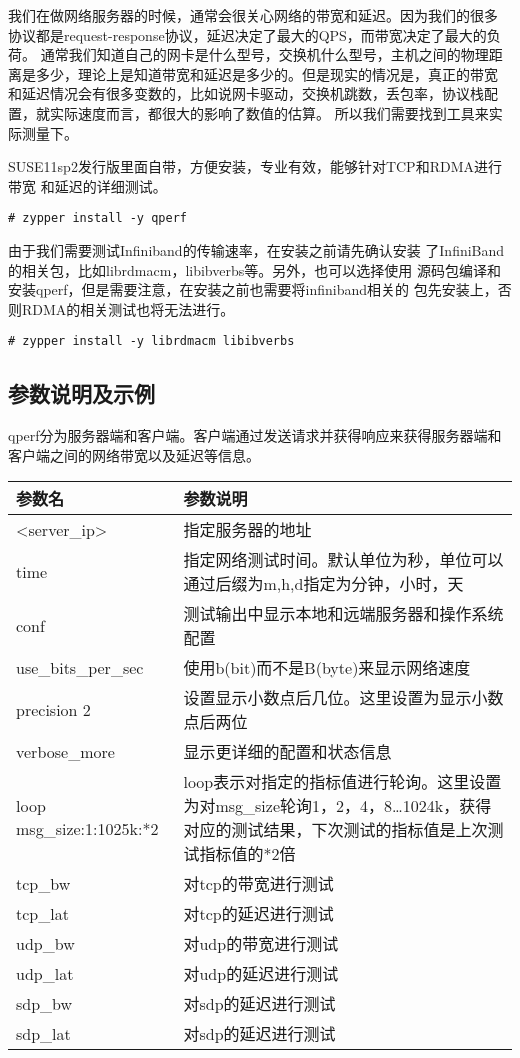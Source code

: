 我们在做网络服务器的时候，通常会很关心网络的带宽和延迟。因为我们的很多
协议都是request-response协议，延迟决定了最大的QPS，而带宽决定了最大的负
荷。 通常我们知道自己的网卡是什么型号，交换机什么型号，主机之间的物理距
离是多少，理论上是知道带宽和延迟是多少的。但是现实的情况是，真正的带宽
和延迟情况会有很多变数的，比如说网卡驱动，交换机跳数，丢包率，协议栈配
置，就实际速度而言，都很大的影响了数值的估算。 所以我们需要找到工具来实
际测量下。

SUSE11sp2发行版里面自带，方便安装，专业有效，能够针对TCP和RDMA进行带宽
和延迟的详细测试。

\begin{verbatim}
# zypper install -y qperf
\end{verbatim}

由于我们需要测试Infiniband的传输速率，在安装之前请先确认安装
了InfiniBand的相关包，比如librdmacm，libibverbs等。另外，也可以选择使用
源码包编译和安装qperf，但是需要注意，在安装之前也需要将infiniband相关的
包先安装上，否则RDMA的相关测试也将无法进行。

\begin{verbatim}
# zypper install -y librdmacm libibverbs
\end{verbatim}

\subsection{参数说明及示例}

qperf分为服务器端和客户端。客户端通过发送请求并获得响应来获得服务器端和
客户端之间的网络带宽以及延迟等信息。

\begin{tabular}{lp{20em}}
  \toprule
  参数名       & 参数说明 \\
  \midrule
  <server\_ip>	& 指定服务器的地址 \\
  time            & 指定网络测试时间。默认单位为秒，单位可以通过后缀为m,h,d指定为分钟，小时，天 \\
  conf	        & 测试输出中显示本地和远端服务器和操作系统配置 \\
  use\_bits\_per\_sec & 使用b(bit)而不是B(byte)来显示网络速度 \\
  precision 2	& 设置显示小数点后几位。这里设置为显示小数点后两位 \\
  verbose\_more	& 显示更详细的配置和状态信息 \\
  loop msg\_size:1:1025k:*2 	& loop表示对指定的指标值进行轮询。这里设置为对msg\_size轮询1，2，4，8…1024k，获得对应的测试结果，下次测试的指标值是上次测试指标值的*2倍 \\
  tcp\_bw	& 对tcp的带宽进行测试 \\
  tcp\_lat	& 对tcp的延迟进行测试 \\
  udp\_bw	& 对udp的带宽进行测试 \\
  udp\_lat	& 对udp的延迟进行测试 \\
  sdp\_bw	& 对sdp的延迟进行测试 \\
  sdp\_lat	& 对sdp的延迟进行测试 \\
\bottomrule
\end{tabular}

